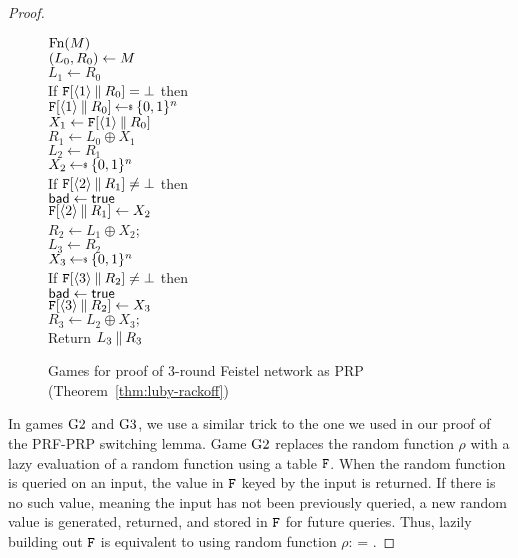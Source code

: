 \begin{proof}
\begin{figure}[t]
{\underline{$\textnormal{Fn}(M)$}\\
$(L_0, R_0) \gets M$\\
$L_1 \gets R_0$\\
If $\mathtt{F}[\langle1\rangle\: \| \: R_0] = \bot$ then\\
\ind $\TabF[\langle1\rangle\concat R_0] \getsr \bits^n$\\
$X_1 \gets \mathtt{F}[\langle1\rangle\: \| \: R_0]$\\
$R_1 \gets L_0 \oplus X_1$\\
$L_2 \gets R_1$\\
$X_2 \getsr \bits^n$\\
If $\mathtt{F}[\langle2\rangle\: \| \: R_1] \ne \bot$ then\\
\ind $\mathsf{bad}\gets\mathsf{true}$\\
$\mathtt{F}[\langle2\rangle\: \| \: R_1] \gets X_2$\\
$R_2 \gets L_1 \oplus X_2$;\;\;\\
$L_3 \gets R_2$\\
$X_3 \getsr \bits^n$\\
If $\mathtt{F}[\langle3\rangle\: \| \: R_2] \ne \bot$ then\\
\ind $\mathsf{bad}\gets\mathsf{true}$\\
$\mathtt{F}[\langle3\rangle\: \| \: R_2] \gets X_3$\\
$R_3 \gets L_2 \oplus X_3;$\;\;\\
Return $L_3 \: \| \: R_3$
}
\caption{Games for proof of 3-round Feistel network as PRP (Theorem~\ref{thm:luby-rackoff})}
\label{fig:games-luby-rackoff}
\end{figure}

In games ${{\textnormal G}}2$ and ${{\textnormal G}}3$, we use a similar trick to the one we used in our proof of the PRF-PRP switching lemma.
Game ${{\textnormal G}}2$ replaces the random function $\rho$ with a lazy evaluation of a random function using a table $\mathtt{F}$.
When the random function is queried on an input, the value in $\mathtt{F}$ keyed by the input is returned.
If there is no such value, meaning the input has not been previously queried, a new random value is generated, returned, and stored in $\mathtt{F}$ for future queries.
Thus, lazily building out $\mathtt{F}$ is equivalent to using random function $\rho$:
\bnm
{} = .
\enm


\end{proof}
